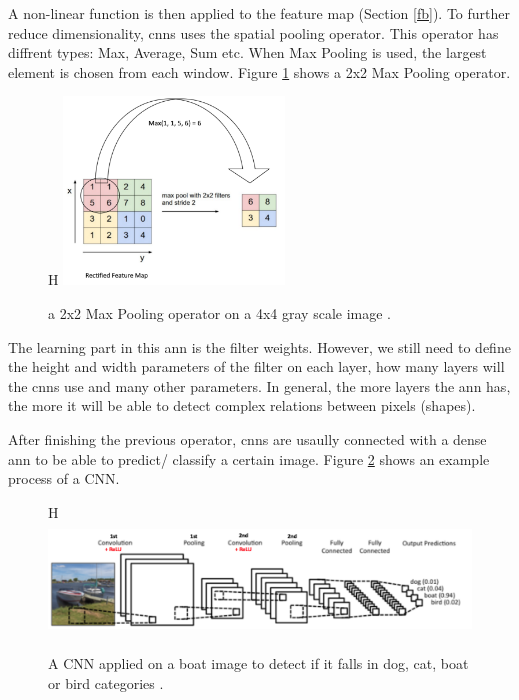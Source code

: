 \documentclass[runningheads]{llncs}
\begin{document}

A non-linear function is then applied to the feature map (Section \ref{fb}).
To further reduce dimensionality, \gls{cnns} uses the spatial pooling operator.
This operator has diffrent types: Max, Average, Sum etc. 
When Max Pooling is used, the largest element is chosen from each window.
Figure \ref{mp} shows a 2x2 Max Pooling operator.


\begin{figure}{H}
    \label{mp}
    \centering
    \includegraphics[height=5cm]{max_pool}
    \caption{a 2x2 Max Pooling operator on a 4x4 gray scale image \cite{maxpool}.}
\end{figure}

The learning part in this \gls{ann} is the filter weights. However, we 
still need to define the height and width parameters of the filter on each layer, how
many layers will the \gls{cnns} use and many other parameters. In general, 
the more layers the \gls{ann} has, the more it will be able to detect complex 
relations between pixels (shapes).

After finishing the previous operator, \gls{cnns} are usaully connected with 
a dense \gls{ann} to be able to predict/ classify a certain image. Figure \ref{dcnnp} 
shows an example process of a CNN.

\begin{figure}{H}
    \label{dcnnp}
    \centering
    \includegraphics[height=3cm]{dcnnp}
    \caption{A CNN applied on a boat image to detect if it falls in 
    dog, cat, boat or bird categories \cite{cnnpro}.}
\end{figure}
\end{document}
